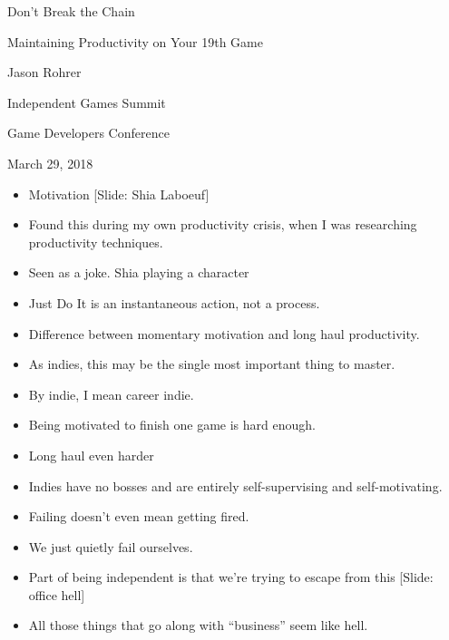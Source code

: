 \documentclass[12pt]{article}
\begin{document}
\begin{center}
Don't Break the Chain

Maintaining Productivity on Your 19th Game 

Jason Rohrer

Independent Games Summit

Game Developers Conference 

March 29, 2018
\end{center}


{\Huge



\begin{itemize}

\item Motivation [Slide:  Shia Laboeuf]

\item Found this during my own productivity crisis, when I was researching productivity techniques.

\item Seen as a joke.  Shia playing a character

\item Just Do It is an instantaneous action, not a process.

\item Difference between momentary motivation and long haul productivity.

\item As indies, this may be the single most important thing to master.

\item By indie, I mean career indie.

\item Being motivated to finish one game is hard enough.

\item Long haul even harder

\item Indies have no bosses and are entirely self-supervising and self-motivating.

\item Failing doesn't even mean getting fired.  

\item We just quietly fail ourselves.

\item Part of being independent is that we're trying to escape from this [Slide:  office hell]

\item All those things that go along with ``business'' seem like hell.


\end{itemize}}
\end{document}
